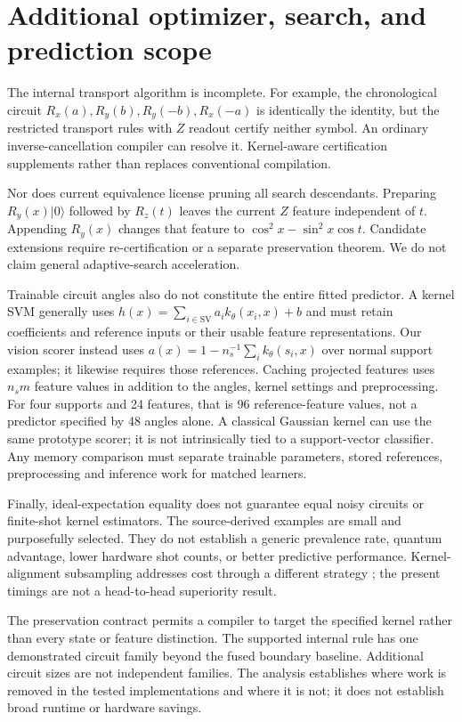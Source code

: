\section{Additional optimizer, search, and prediction scope}
\label{app:additional_scope}
The internal transport algorithm is incomplete. For example, the chronological circuit
$R_x(a),R_y(b),R_y(-b),R_x(-a)$ is identically the identity, but the
restricted transport rules with $Z$ readout certify neither symbol.
An ordinary inverse-cancellation compiler can resolve it. Kernel-aware
certification supplements rather than replaces conventional compilation.

Nor does current equivalence license pruning all search descendants.
Preparing $R_y(x)|0\rangle$ followed by $R_z(t)$ leaves the current
$Z$ feature independent of $t$. Appending $R_y(x)$ changes that feature
to $\cos^2x-\sin^2x\cos t$. Candidate extensions require
re-certification or a separate preservation theorem. We do not claim
general adaptive-search acceleration.

Trainable circuit angles also do not constitute the entire fitted
predictor. A kernel SVM generally uses
$h(x)=\sum_{i\in\mathrm{SV}}a_i k_\theta(x_i,x)+b$ and must retain
coefficients and reference inputs or their usable feature
representations. Our vision scorer instead uses
$a(x)=1-n_s^{-1}\sum_i k_\theta(s_i,x)$ over normal support examples;
it likewise requires those references. Caching projected features
uses $n_s m$ feature values in addition to the angles, kernel settings
and preprocessing. For four supports and 24 features, that is 96
reference-feature values, not a predictor specified by 48 angles
alone. A classical Gaussian kernel can use the same prototype scorer;
it is not intrinsically tied to a support-vector classifier.
Any memory comparison must separate trainable parameters, stored
references, preprocessing and inference work for matched learners.

Finally, ideal-expectation equality does not guarantee equal noisy
circuits or finite-shot kernel estimators. The source-derived examples
are small and purposefully selected. They do not establish a generic
prevalence rate, quantum advantage, lower hardware shot counts, or
better predictive performance. Kernel-alignment subsampling addresses
cost through a different strategy \cite{sahin2024subsampling}; the
present timings are not a head-to-head superiority result.

The preservation contract permits a compiler to target the specified
kernel rather than every state or feature distinction. The supported
internal rule has one demonstrated circuit family beyond the fused
boundary baseline. Additional circuit sizes are not independent
families. The analysis establishes where work is removed in the tested
implementations and where it is not; it does not establish broad runtime
or hardware savings.
